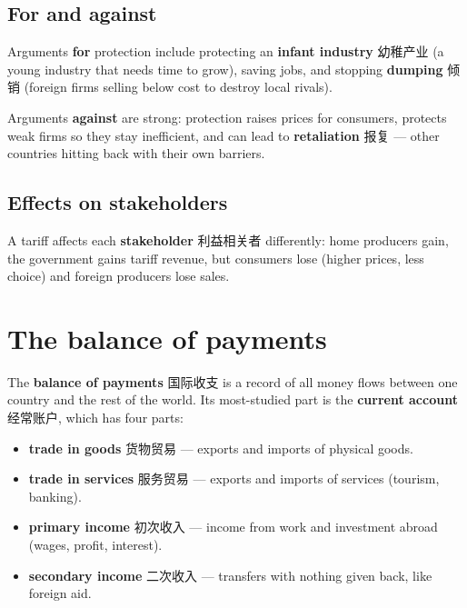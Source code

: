\documentclass[11pt]{article}
\begin{document}
\subsection*{For and against}

Arguments \textbf{for} protection include protecting an \textbf{infant industry} 幼稚产业 (a young industry that needs time to grow), saving jobs, and stopping \textbf{dumping} 倾销 (foreign firms selling below cost to destroy local rivals).

Arguments \textbf{against} are strong: protection raises prices for consumers, protects weak firms so they stay inefficient, and can lead to \textbf{retaliation} 报复 — other countries hitting back with their own barriers.

\subsection*{Effects on stakeholders}

A tariff affects each \textbf{stakeholder} 利益相关者 differently: home producers gain, the government gains tariff revenue, but consumers lose (higher prices, less choice) and foreign producers lose sales.

\section*{The balance of payments}

The \textbf{balance of payments} 国际收支 is a record of all money flows between one country and the rest of the world. Its most-studied part is the \textbf{current account} 经常账户, which has four parts:

\begin{itemize}
\item \textbf{trade in goods} 货物贸易 — exports and imports of physical goods.

\item \textbf{trade in services} 服务贸易 — exports and imports of services (tourism, banking).

\item \textbf{primary income} 初次收入 — income from work and investment abroad (wages, profit, interest).

\item \textbf{secondary income} 二次收入 — transfers with nothing given back, like foreign aid.

\end{itemize}
\end{document}
